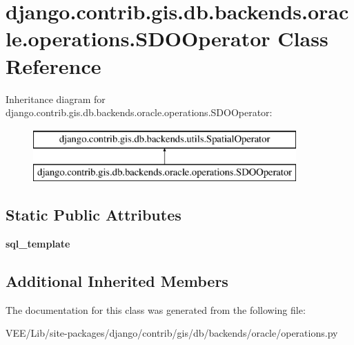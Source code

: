 \hypertarget{classdjango_1_1contrib_1_1gis_1_1db_1_1backends_1_1oracle_1_1operations_1_1_s_d_o_operator}{}\section{django.\+contrib.\+gis.\+db.\+backends.\+oracle.\+operations.\+S\+D\+O\+Operator Class Reference}
\label{classdjango_1_1contrib_1_1gis_1_1db_1_1backends_1_1oracle_1_1operations_1_1_s_d_o_operator}
Inheritance diagram for django.\+contrib.\+gis.\+db.\+backends.\+oracle.\+operations.\+S\+D\+O\+Operator\+:\begin{figure}[H]
\begin{center}
\leavevmode
\includegraphics[height=2.000000cm]{classdjango_1_1contrib_1_1gis_1_1db_1_1backends_1_1oracle_1_1operations_1_1_s_d_o_operator}
\end{center}
\end{figure}
\subsection*{Static Public Attributes}
\begin{DoxyCompactItemize}
\item 
\mbox{\label{classdjango_1_1contrib_1_1gis_1_1db_1_1backends_1_1oracle_1_1operations_1_1_s_d_o_operator_a6de00c7cec850fa3fa9dd609ed086457}} 
{\bfseries sql\+\_\+template}
\end{DoxyCompactItemize}
\subsection*{Additional Inherited Members}


The documentation for this class was generated from the following file\+:\begin{DoxyCompactItemize}
\item 
V\+E\+E/\+Lib/site-\/packages/django/contrib/gis/db/backends/oracle/operations.\+py\end{DoxyCompactItemize}
